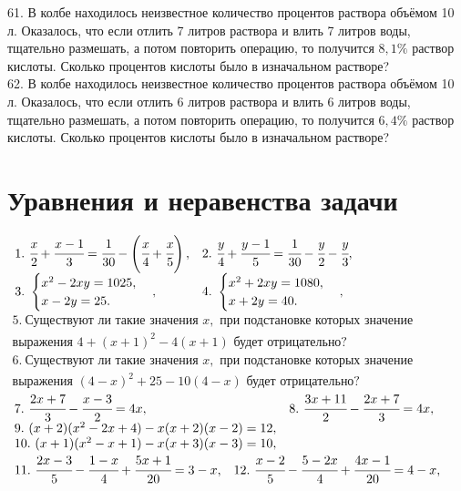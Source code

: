 \documentclass[12pt]{article}
\begin{document}
61.  В колбе находилось неизвестное количество процентов раствора объёмом 10 л. Оказалось, что
если отлить 7 литров раствора и влить 7 литров воды, тщательно размешать, а потом повторить
операцию, то получится $8,1\%$ раствор кислоты. Сколько процентов кислоты было в изначальном растворе?\\
62. В колбе находилось неизвестное количество процентов раствора объёмом 10 л. Оказалось, что
если отлить 6 литров раствора и влить 6 литров воды, тщательно размешать, а потом повторить
операцию, то получится $6,4\%$ раствор кислоты. Сколько процентов кислоты было в изначальном
растворе?
\newpage
\section{Уравнения и неравенства задачи}
$\begin{array}{ll}
1.\ \cfrac{x}{2}+\cfrac{x-1}{3}=\cfrac{1}{30}-\left(\cfrac{x}{4}+\cfrac{x}{5}\right),&
2.\ \cfrac{y}{4}+\cfrac{y-1}{5}=\cfrac{1}{30}-\cfrac{y}{2}-\cfrac{y}{3},\\
3.\ \begin{cases} x^2-2xy=1025,\\x-2y=25.\end{cases},&
4.\ \begin{cases} x^2+2xy=1080,\\x+2y=40.\end{cases},\end{array}$\\
$\begin{array}{l}
5.\ \text{Существуют ли такие значения }x,\text{ при подстановке которых значение}\\
\text{выражения }4+(x+1)^2-4(x+1)\text{ будет отрицательно?}\\
6.\ \text{Существуют ли такие значения }x,\text{ при подстановке которых значение}\\
\text{выражения }(4-x)^2+25-10(4-x)\text{ будет отрицательно?}
\end{array}$\\
$\begin{array}{ll}
7.\ \cfrac{2x+7}{3}-\cfrac{x-3}{2}=4x,&
8.\ \cfrac{3x+11}{2}-\cfrac{2x+7}{3}=4x,\\
9.\ (x+2)(x^2-2x+4)-x(x+2)(x-2)=12,\\
10.\ (x+1)(x^2-x+1)-x(x+3)(x-3)=10,\end{array}$\\
$\begin{array}{ll}11.\ \cfrac{2x-3}{5}-\cfrac{1-x}{4}+\cfrac{5x+1}{20}=3-x,&
12.\ \cfrac{x-2}{5}-\cfrac{5-2x}{4}+\cfrac{4x-1}{20}=4-x,
\end{array}$\\
\end{document}

